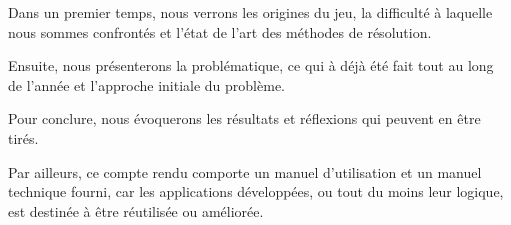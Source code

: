 \documentclass{article}
\begin{document}
	Dans un premier temps, nous verrons les origines du jeu, la difficulté à laquelle nous sommes confrontés et l'état de l'art des méthodes de résolution.
	
	Ensuite, nous présenterons la problématique, ce qui à déjà été fait tout au long de l'année et l'approche initiale du problème.
	
	Pour conclure, nous évoquerons les résultats et réflexions qui peuvent en être tirés.
	
	Par ailleurs, ce compte rendu comporte un manuel d'utilisation et un manuel technique fourni, car les applications développées, ou tout du moins leur logique, est destinée à être réutilisée ou améliorée.


	\newpage
	

	\newpage
	

	\newpage
	

	\newpage
	
	
	\newpage
	

	\newpage
	
	
	\newpage
	

	

	\printbibliography
\end{document}
